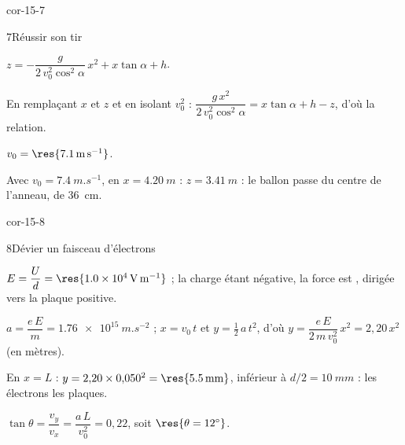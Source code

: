 \begin{blocLivre}{cor-15-7}
\begin{corrige}{7}{Réussir son tir}
\begin{questions}
\item $z=-\dfrac{g}{2\,v_0^2\cos^2\alpha}\,x^2+x\tan\alpha+h$.
\item En remplaçant $x$ et $z$ et en isolant $v_0^2$ : $\dfrac{g\,x^2}{2\,v_0^2\cos^2\alpha}=x\tan\alpha+h-z$, d'où la relation.
\item $v_0=\res{\qty{7,1}{m.s^{-1}}}$.
\item Avec $v_0=\qty{7,4}{m.s^{-1}}$, en $x=\qty{4,20}{m}$ : $z=\qty{3,41}{m}$ : le ballon passe  du
centre de l'anneau, de \qty{36}{cm}.
\end{questions}
\end{corrige}
\end{blocLivre}
\begin{blocLivre}{cor-15-8}
\begin{corrige}{8}{Dévier un faisceau d'électrons}
\begin{questions}
\item $E=\dfrac{U}{d}=\res{\qty{1,0e4}{V.m^{-1}}}$ ; la charge étant négative, la force est ,
dirigée vers la plaque positive.
\item $a=\dfrac{e\,E}{m}=\qty{1,76e15}{m.s^{-2}}$ ; $x=v_0\,t$ et $y=\frac12\,a\,t^2$, d'où
$y=\dfrac{e\,E}{2\,m\,v_0^2}\,x^2=2{,}20\,x^2$ (en mètres).
\item En $x=L$ : $y=2{,}20\times0{,}050^2=\res{\qty{5,5}{mm}}$, inférieur à $d/2=\qty{10}{mm}$ : les électrons
 les plaques.
\item $\tan\theta=\dfrac{v_y}{v_x}=\dfrac{a\,L}{v_0^2}=0{,}22$, soit $\res{\theta=12^\circ}$.
\end{questions}
\end{corrige}
\end{blocLivre}
